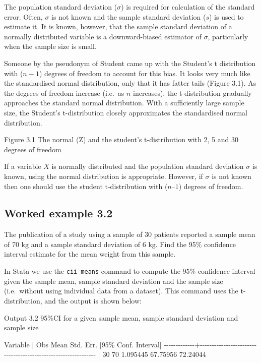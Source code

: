 \documentclass[
]{memoir}
\newenvironment{Shaded}{\begin{snugshade}}{\end{snugshade}}
\newcommand{\NormalTok}[1]{#1}
\begin{document}
The population standard deviation (\(\sigma\)) is required for calculation of the standard error. Often, \(\sigma\) is not known and the sample standard deviation (\(s\)) is used to estimate it. It is known, however, that the sample standard deviation of a normally distributed variable is a downward-biased estimator of \(\sigma\), particularly when the sample size is small.

Someone by the pseudonym of Student came up with the Student's t distribution with (\(n-1\)) degrees of freedom to account for this bias. It looks very much like the standardised normal distribution, only that it has fatter tails (Figure 3.1). As the degrees of freedom increase (i.e.~as \(n\) increases), the t-distribution gradually approaches the standard normal distribution. With a sufficiently large sample size, the Student's t-distribution closely approximates the standardised normal distribution.

Figure 3.1 The normal (Z) and the student's t-distribution with 2, 5 and 30 degrees of freedom

If a variable \(X\) is normally distributed and the population standard deviation \(\sigma\) is known, using the normal distribution is appropriate. However, if \(\sigma\) is not known then one should use the student t-distribution with (\(n – 1\)) degrees of freedom.

\hypertarget{worked-example-3.2}{%
\subsection{Worked example 3.2}\label{worked-example-3.2}}

The publication of a study using a sample of 30 patients reported a sample mean of 70 kg and a sample standard deviation of 6 kg. Find the 95\% confidence interval estimate for the mean weight from this sample.

In Stata we use the \texttt{cii\ means} command to compute the 95\% confidence interval given the sample mean, sample standard deviation and the sample size (i.e.~without using individual data from a dataset). This command uses the t-distribution, and the output is shown below:

Output 3.2 95\%CI for a given sample mean, sample standard deviation and sample size

\begin{Shaded}
\begin{Highlighting}[]
\NormalTok{    Variable |        Obs        Mean    Std. Err.       [95\% Conf. Interval]}
\NormalTok{{-}{-}{-}{-}{-}{-}{-}{-}{-}{-}{-}{-}{-}+{-}{-}{-}{-}{-}{-}{-}{-}{-}{-}{-}{-}{-}{-}{-}{-}{-}{-}{-}{-}{-}{-}{-}{-}{-}{-}{-}{-}{-}{-}{-}{-}{-}{-}{-}{-}{-}{-}{-}{-}{-}{-}{-}{-}{-}{-}{-}{-}{-}{-}{-}{-}{-}{-}{-}{-}{-}{-}{-}{-}{-}{-}{-}}
\NormalTok{             |         30          70    1.095445        67.75956    72.24044}
\end{Highlighting}
\end{Shaded}
\end{document}
